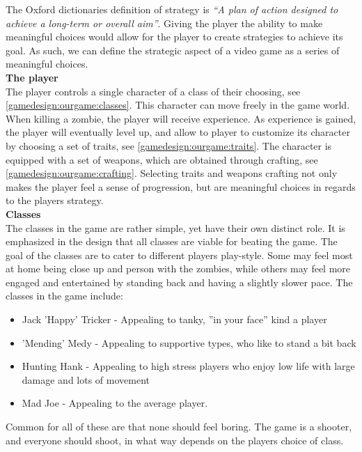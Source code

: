 The Oxford dictionaries definition of strategy is \textit{``A plan of action designed to achieve a long-term or overall aim''}.\cite{strategyOx}
Giving the player the ability to make meaningful choices would allow for the player to create strategies to achieve its goal.
As such, we can define the strategic aspect of a video game as a series of meaningful choices.\\

\textbf{The player}\\
The player controls a single character of a class of their choosing, see \ref{gamedesign:ourgame:classes}. 
This character can move freely in the game world.
When killing a zombie, the player will receive experience.
As experience is gained, the player will eventually level up, and allow to player to customize its character by choosing a set of traits, see \ref{gamedesign:ourgame:traits}.
The character is equipped with a set of weapons, which are obtained through crafting, see \ref{gamedesign:ourgame:crafting}.
Selecting traits and weapons crafting not only makes the player feel a sense of progression, but are meaningful choices in regards to the players strategy.\\

\textbf{Classes}\label{gamedesign:ourgame:classes}\\
The classes in the game are rather simple, yet have their own distinct role.
It is emphasized in the design that all classes are viable for beating the game.
The goal of the classes are to cater to different players play-style.
Some may feel most at home being close up and person with the zombies, while others may feel more engaged and entertained by standing back and having a slightly slower pace.
The classes in the game include:

\begin{itemize}
\item Jack 'Happy' Tricker - Appealing to tanky, ''in your face'' kind a player
\item 'Mending' Medy - Appealing to supportive types, who like to stand a bit back
\item Hunting Hank - Appealing to high stress players who enjoy low life with large damage and lots of movement
\item Mad Joe - Appealing to the average player. 
\end{itemize}

Common for all of these are that none should feel boring. 
The game is a shooter, and everyone should shoot, in what way depends on the players choice of class.\\

